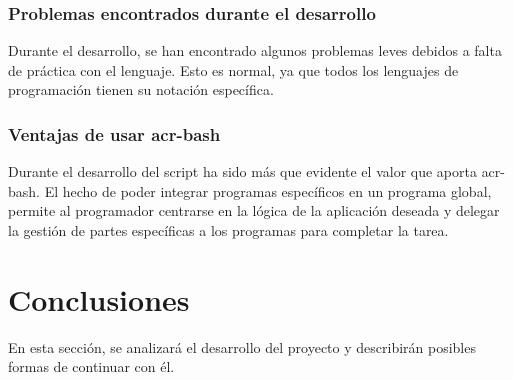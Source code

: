 \documentclass[twoside, titlepage, 12pt, a4paper]{article}
\let\oldsection\section
\def\section{\cleardoublepage\oldsection}
\begin{document}
{\subsubsection{Problemas encontrados durante el desarrollo}
Durante el desarrollo, se han encontrado algunos problemas leves debidos a falta de práctica con el lenguaje. Esto es normal, ya que todos los lenguajes de programación tienen su notación específica.
\subsubsection{Ventajas de usar \gls{acr-bash}}
Durante el desarrollo del \gls{script} ha sido más que evidente el valor que aporta \gls{acr-bash}. El hecho de poder integrar programas específicos en un programa global, permite al programador centrarse en la lógica de la aplicación deseada y delegar la gestión de partes específicas a los programas para completar la tarea.
\clearpage
\section{Conclusiones}
En esta sección, se analizará el desarrollo del proyecto y describirán posibles formas de continuar con él.
}
\end{document}
